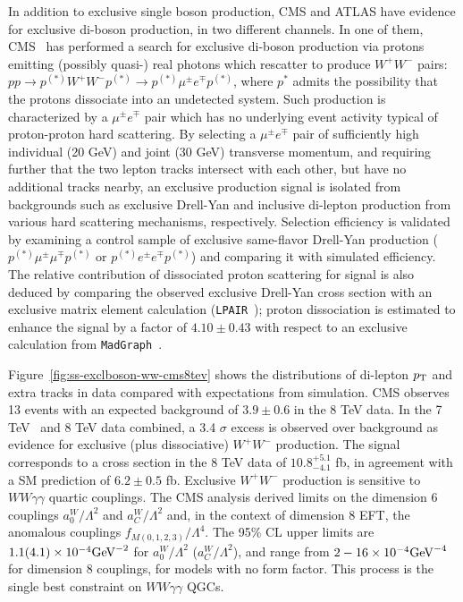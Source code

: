 
In addition to exclusive single boson production, CMS and ATLAS have
evidence for exclusive di-boson production, in two different channels.
In one of them, CMS~\cite{Khachatryan:2016mud} has performed a search
for exclusive di-boson production via protons emitting (possibly
quasi-) real photons which rescatter to produce $W^+W^-$ pairs:
$pp \to p^{(*)}W^+ W^- p^{(*)} \to p^{(*)}\mu^{\pm}e^{\mp}p^{(*)}$,
where $p^*$ admits the possibility that the protons dissociate into an
undetected system.  Such production is characterized by a
$\mu^{\pm}e^{\mp}$ pair which has no underlying event activity typical
of proton-proton hard scattering.  By selecting a $\mu^{\pm}e^{\mp}$
pair of sufficiently high individual (20 GeV) and joint (30 GeV)
transverse momentum, and requiring further that the two lepton tracks
intersect with each other, but have no additional tracks nearby, an
exclusive production signal is isolated from backgrounds such as
exclusive Drell-Yan and inclusive di-lepton production from various
hard scattering mechanisms, respectively.  Selection efficiency is
validated by examining a control sample of exclusive same-flavor
Drell-Yan production ($p^{(*)}\mu^{\pm}\mu^{\mp}p^{(*)}$ or
$p^{(*)}e^{\pm}e^{\mp}p^{(*)}$) and comparing it with simulated
efficiency.  The relative contribution of dissociated proton
scattering for signal is also deduced by comparing the observed
exclusive Drell-Yan cross section with an exclusive matrix element
calculation (\texttt{LPAIR}~\cite{Vermaseren:1982cz,Baranov:1991yq});
proton dissociation is estimated to enhance the signal by a factor of
$4.10 \pm 0.43$ with respect to an exclusive calculation
from \texttt{MadGraph}~\cite{Alwall:2011uj,Alwall:2014hca}.

Figure~\ref{fig:ss-exclboson-ww-cms8tev} shows the distributions of
di-lepton $p_{\mathrm{T}}$ and extra tracks in data compared with expectations
from simulation.  CMS observes 13 events with an expected background
of $3.9\pm0.6$ in the 8 TeV data.  In the 7
TeV~\cite{Chatrchyan:2013foa} and 8 TeV data combined, a 3.4 $\sigma$
excess is observed over background as evidence for exclusive (plus
dissociative) $W^+W^-$ production.  The signal corresponds to a cross
section in the 8 TeV data of $10.8^{+5.1}_{-4.1}$ fb, in agreement
with a SM prediction of $6.2\pm0.5$ fb.  Exclusive $W^+W^-$ production
is sensitive to $WW\gamma\gamma$ quartic couplings. The CMS analysis
derived limits on the dimension 6 couplings $a^W_0/\Lambda^2$ and
$a^W_C/\Lambda^2$ and, in the context of dimension 8 EFT, the
anomalous couplings $f_{M(0,1,2,3)}/\Lambda^4$.  The 95\% CL upper
limits are $1.1(4.1)\times 10^{-4} \rm{GeV}^{-2}$ for
$a^W_0/\Lambda^2$ ($a^W_C/\Lambda^2$), and range from $2-16 \times
10^{-4} \rm{GeV}^{-4}$ for dimension 8 couplings, for models with no
form factor.  This process is the single best constraint on
$WW\gamma\gamma$ QGCs.

